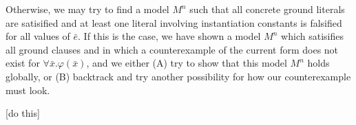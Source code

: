 \documentclass{llncs}
\begin{document}
Otherwise, we may try to find a model $M^n$ such that all concrete ground literals are satisified and at least one literal involving instantiation constants is falsified for all values of $\bar{e}$.
If this is the case, we have shown a model $M^n$ which satisifies all ground clauses and in which a counterexample of the current form does not exist for $\forall \bar{x}. \varphi( \bar{x} )$, and we either (A) try to show that this model $M^n$ holds globally, or (B) backtrack and try another possibility for how our counterexample must look.

[do this]

\begin{comment}
We are looking for a model $M^n$ such that every concrete ground literal is satisified and every literal involving instantiation constants is falsified for all values of $\bar{e}$.
For all symbols $f$ where $f( t_1, \ldots t_n )$ is in some non-singleton equivalence class and $f( t_1, \ldots t_n )$ contains at least one instantiation constant as a subterm, we will require an interpretation for $f$ in our model $M^n$.
The following examples show simple cases in which this process may succeed or fail. \\

{\bf Example 4(a)}
Say we wish to determine the satisifiability of $a = b \wedge (\psi:) \forall x. f( x ) \neq a$.
After Decide (twice), Counterexample $\forall$-Inst and unit propagation, we will obtain a state in which $a = b$ and $f( e ) = a$ are asserted.
We must constrain $M^n$ such that $\forall x. f( x ) \neq a$ and $a = b$.
This model satisifies $\psi$. \\

{\bf Example 4(b)}
Say we wish to determine the satisifiability of $(\psi:) \forall x. f( x ) \neq f( b )$.
Similarly, we will obtain a state in which $f( e ) = f( b )$ is asserted.
We wish to contrain $M^n$ such that $\forall x. f( x ) \neq f( b )$, which is impossible since $x$ can be equal $b$.
As we will see, this will signal for $Match_{EUF}$ to return the substitution $\{ x \rightarrow b \}$. \\

Let us consider all cases in which a conflict may arise when building a candidate model $M^n$ during $Match_{EUF}( \bar{e} )$ where $\bar{e} \mapsto^I \forall \bar{x}. \varphi( \bar{x} )$.
These are as follows: \\

(1) Terms $f( t_1, \ldots t_n )$ and $f( s_1, \ldots s_n )$ are in the same equivalence class, where $f( t_1, \ldots t_n )$ or $f( s_1, \ldots s_n )$ contains at least one instantiation constant.  In this case, we require that $\forall \bar{x}. (f( t_1, \ldots t_n ) \neq f( s_1, \ldots s_n ))[\bar{x}/\bar{e}]$. 
This further requires that $\forall \bar{x}. (t_1 \neq s_1 \vee \ldots \vee t_n \neq s_n)[\bar{x}/\bar{e}]$. \\


\end{comment}
\end{document}
